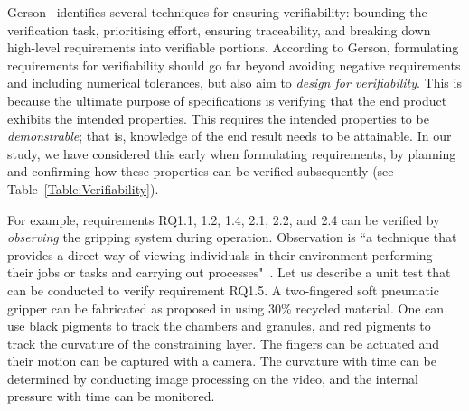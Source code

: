 \documentclass[lettersize,journal]{IEEEtran}
\begin{document}
Gerson~\cite{Gerson1993} identifies several techniques for ensuring verifiability: bounding the verification task, prioritising effort, ensuring traceability, and breaking down high-level requirements into verifiable portions. 
According to Gerson, formulating requirements for verifiability should go far beyond avoiding negative requirements and including numerical tolerances, but also aim to \emph{design for verifiability}. 
This is because the ultimate purpose of specifications is verifying that the end product exhibits the intended properties. 
This requires the intended properties to be \emph{demonstrable}; that is, knowledge of the end result needs to be attainable. 
In our study, we have considered this early when formulating requirements, by planning and confirming how these properties can be verified subsequently (see Table~\ref{Table:Verifiability}). 

For example, requirements RQ1.1, 1.2, 1.4, 2.1, 2.2, and 2.4 can be verified by \emph{observing} the gripping system during operation. 
Observation is ``a technique that provides a direct way of viewing individuals in their environment performing their jobs or tasks and carrying out processes"~\cite{ISO24765:2017}.
Let us describe a unit test that can be conducted to verify requirement RQ1.5. 
A two-fingered soft pneumatic gripper can be fabricated as proposed in \cite{Partridge2022} using 30\% recycled material. 
One can use black pigments to track the chambers and granules, and red pigments to track the curvature of the constraining layer. 
The fingers can be actuated and their motion can be captured with a camera. 
The curvature with time can be determined by conducting image processing on the video, and the internal pressure with time can be monitored.

%
\end{document}
